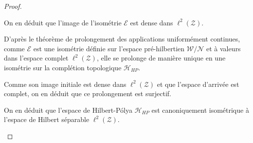 \documentclass[Riemann_Hypothesis.tex]{subfiles}
\begin{document}
\begin{proof}
\begin{part_proof}
        On en déduit que l'image de l'isométrie $\mathcal{E}$ est dense dans $\ell^2(\mathcal{Z})$. \par
        D'après le théorème de prolongement des applications uniformément continues, comme $\mathcal{E}$ est une isométrie définie sur l'espace pré-hilbertien $\mathcal{W}/\mathcal{N}$ et à valeurs dans l'espace complet $\ell^2(\mathcal{Z})$, elle se prolonge de manière unique en une isométrie sur la complétion topologique $\mathcal{H}_{HP}$. \par
        Comme son image initiale est dense dans $\ell^2(\mathcal{Z})$ et que l'espace d'arrivée est complet, on en déduit que ce prolongement est surjectif. \par
        On en déduit que l'espace de Hilbert-Pólya $\mathcal{H}_{HP}$ est canoniquement isométrique à l'espace de Hilbert séparable $\ell^2(\mathcal{Z})$.
    \end{part_proof}


\end{proof}
\end{document}
